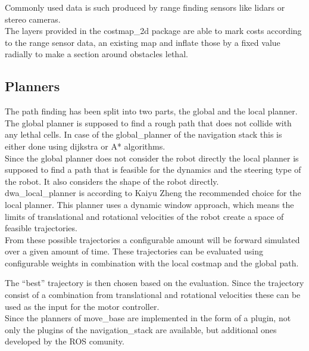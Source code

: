 Commonly used data is such produced by range finding sensors like lidars or stereo cameras.\\

The layers provided in the costmap\_2d package are able to mark costs according to the range sensor data, an existing map and inflate those by a fixed value radially\cite{costmap} to make a section around obstacles lethal.

\subsection{Planners}

The path finding has been split into two parts, the global and the local planner.\\

The global planner is supposed to find a rough path that does not collide with any lethal cells. In case of the global\_planner of the navigation stack this is either done using dijkstra or A* algorithms.\\

Since the global planner does not consider the robot directly the local planner is supposed to find a path that is feasible for the dynamics and the steering type of the robot. It also considers the shape of the robot directly\cite{movebase}.\\



dwa\_local\_planner is according to Kaiyu Zheng the recommended choice for the local planner\cite{navtuningguide}. This planner uses a dynamic window approach, which means the limits of translational and rotational velocities of the robot create a space of feasible trajectories.\\ 
From these possible trajectories a configurable amount will be forward simulated over a given amount of time. These trajectories can be evaluated using configurable weights in combination with the local costmap and the global path.

The ``best'' trajectory is then chosen based on the evaluation. Since the trajectory consist of a combination from translational and rotational velocities these can be used as the input for the motor controller\cite{dwaplanner}.\\

Since the planners of move\_base are implemented in the form of a plugin, not only the plugins of the navigation\_stack are available, but additional ones developed by the ROS comunity.

